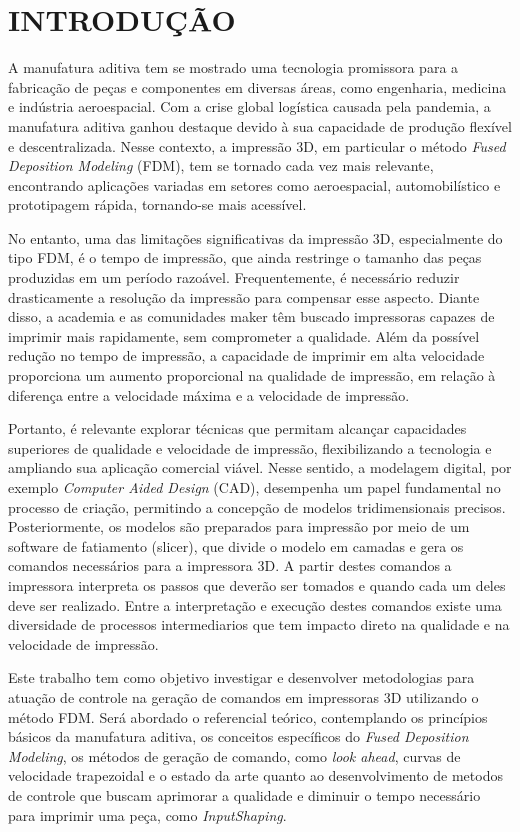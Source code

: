 \chapter{INTRODUÇÃO}
A manufatura aditiva tem se mostrado uma tecnologia promissora para a fabricação de peças e componentes em diversas áreas, como engenharia, medicina e indústria aeroespacial. Com a crise global logística causada pela pandemia, a manufatura aditiva ganhou destaque devido à sua capacidade de produção flexível e descentralizada. Nesse contexto, a impressão 3D, em particular o método \textit{Fused Deposition Modeling} (FDM), tem se tornado cada vez mais relevante, encontrando aplicações variadas em setores como aeroespacial, automobilístico e prototipagem rápida, tornando-se mais acessível.

No entanto, uma das limitações significativas da impressão 3D, especialmente do tipo FDM, é o tempo de impressão, que ainda restringe o tamanho das peças produzidas em um período razoável. Frequentemente, é necessário reduzir drasticamente a resolução da impressão para compensar esse aspecto. Diante disso, a academia e as comunidades maker têm buscado impressoras capazes de imprimir mais rapidamente, sem comprometer a qualidade. Além da possível redução no tempo de impressão, a capacidade de imprimir em alta velocidade proporciona um aumento proporcional na qualidade de impressão, em relação à diferença entre a velocidade máxima e a velocidade de impressão.

Portanto, é relevante explorar técnicas que permitam alcançar capacidades superiores de qualidade e velocidade de impressão, flexibilizando a tecnologia e ampliando sua aplicação comercial viável. Nesse sentido, a modelagem digital, por exemplo \textit{Computer Aided Design} (CAD), desempenha um papel fundamental no processo de criação, permitindo a concepção de modelos tridimensionais precisos. Posteriormente, os modelos são preparados para impressão por meio de um software de fatiamento (slicer), que divide o modelo em camadas e gera os comandos necessários para a impressora 3D. A partir destes comandos a impressora interpreta os passos que deverão ser tomados e quando cada um deles deve ser realizado. Entre a interpretação e execução destes comandos existe uma diversidade de processos intermediarios que tem impacto direto na qualidade e na velocidade de impressão.

Este trabalho tem como objetivo investigar e desenvolver metodologias para atuação de controle na geração de comandos em impressoras 3D utilizando o método FDM. Será abordado o referencial teórico, contemplando os princípios básicos da manufatura aditiva, os conceitos específicos do \textit{Fused Deposition Modeling}, os métodos de geração de comando, como \textit{look ahead}, curvas de velocidade trapezoidal e o estado da arte quanto ao desenvolvimento de metodos de controle que buscam aprimorar a qualidade e diminuir o tempo necessário para imprimir uma peça, como \textit{InputShaping}.

